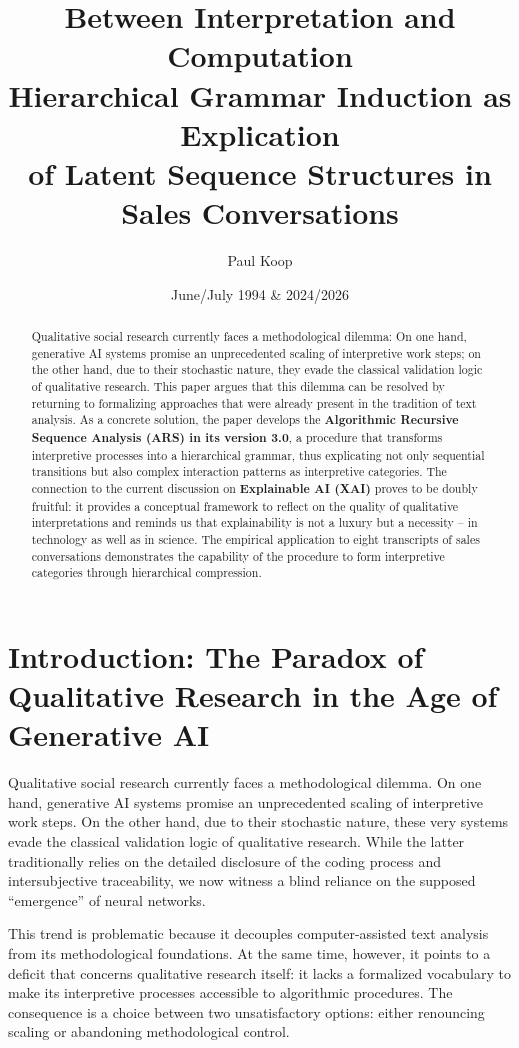 \documentclass[
  12pt,
  a4paper,
  oneside,
  titlepage
]{article}
\title{\Huge\textbf{Between Interpretation and Computation} \\
       \LARGE Hierarchical Grammar Induction as Explication \\
       \LARGE of Latent Sequence Structures in Sales Conversations}
\author{
  \large
  \begin{tabular}{c}
    Paul Koop
  \end{tabular}
}
\date{\large June/July 1994 \& 2024/2026}
\begin{document}
\maketitle

\begin{abstract}
Qualitative social research currently faces a methodological dilemma: 
On one hand, generative AI systems promise an unprecedented scaling 
of interpretive work steps; on the other hand, due to their stochastic 
nature, they evade the classical validation logic of qualitative research. 
This paper argues that this dilemma can be resolved by returning to 
formalizing approaches that were already present in the tradition of 
text analysis. As a concrete solution, the paper develops the 
\textbf{Algorithmic Recursive Sequence Analysis (ARS) in its version 3.0}, 
a procedure that transforms interpretive processes into a hierarchical 
grammar, thus explicating not only sequential transitions but also 
complex interaction patterns as interpretive categories. The connection 
to the current discussion on \textbf{Explainable AI (XAI)} proves to be 
doubly fruitful: it provides a conceptual framework to reflect on the 
quality of qualitative interpretations and reminds us that explainability 
is not a luxury but a necessity – in technology as well as in science. 
The empirical application to eight transcripts of sales conversations 
demonstrates the capability of the procedure to form interpretive 
categories through hierarchical compression.
\end{abstract}

\newpage
\tableofcontents
\newpage

\section{Introduction: The Paradox of Qualitative Research in the Age of Generative AI}

Qualitative social research currently faces a methodological dilemma. 
On one hand, generative AI systems promise an unprecedented scaling 
of interpretive work steps. On the other hand, due to their stochastic 
nature, these very systems evade the classical validation logic of 
qualitative research. While the latter traditionally relies on the 
detailed disclosure of the coding process and intersubjective 
traceability, we now witness a blind reliance on the supposed 
\enquote{emergence} of neural networks.

This trend is problematic because it decouples computer-assisted text 
analysis from its methodological foundations. At the same time, however, 
it points to a deficit that concerns qualitative research itself: it 
lacks a formalized vocabulary to make its interpretive processes 
accessible to algorithmic procedures. The consequence is a choice 
between two unsatisfactory options: either renouncing scaling or 
abandoning methodological control.
\end{document}
